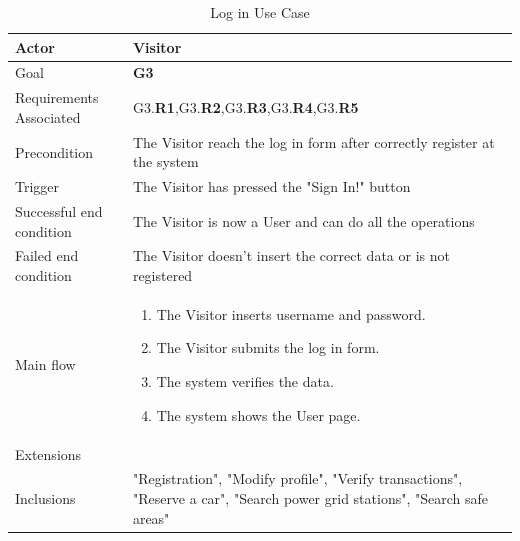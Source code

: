 \newline
\begin{table}[htb]
\begin{center}
\renewcommand{\arraystretch}{1.5}
\begin{tabular}{|l|p{}|}
\hline
Actor & Visitor \\ \hline
Goal & \textbf{G3} \\ \hline
Requirements Associated & G3.\textbf{R1},G3.\textbf{R2},G3.\textbf{R3},G3.\textbf{R4},G3.\textbf{R5} \\ \hline
Precondition & The Visitor reach the log in form after correctly register at the system \\ \hline
Trigger & The Visitor has pressed the "Sign In!" button \\ \hline
Successful end condition & The Visitor is now a User and can do all the operations \\ \hline
Failed end condition & The Visitor doesn't insert the correct data or is not registered \\ \hline
Main flow & \begin{minipage}[t]{0.6\textwidth}
\begin{enumerate}
\addtolength{\itemindent}{0.5cm}
\item The Visitor inserts username and password.
\item The Visitor submits the log in form.
\item The system verifies the data.
\item The system shows the User page.
\vspace{1,5mm}
\end{enumerate}
\end{minipage} \\ \hline
Extensions & \\ \hline
Inclusions & "Registration", "Modify profile", "Verify transactions", "Reserve a car", "Search power grid stations", "Search safe areas"  \\ \hline
\end{tabular}
\caption{Log in Use Case}
\end{center}
\end{table}
\clearpage

